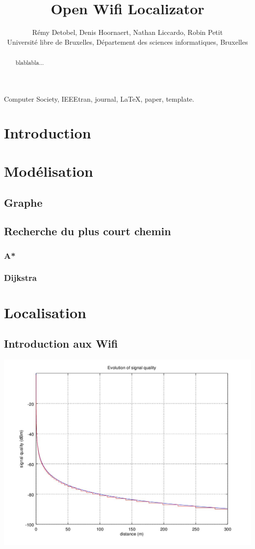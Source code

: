 \documentclass[11pt,journal,compsoc]{IEEEtran}
\begin{document}
\title{Open Wifi Localizator}
\author{Rémy Detobel, Denis Hoornaert, Nathan Liccardo, Robin Petit\\ Université libre de Bruxelles, Département des sciences informatiques, Bruxelles}

\maketitle


\begin{abstract}
  blablabla...
\end{abstract}
\begin{IEEEkeywords}
  Computer Society, IEEEtran, journal, \LaTeX, paper, template.
\end{IEEEkeywords}
\section{Introduction}
\section{Modélisation}
  \subsection{Graphe}
  \subsection{Recherche du plus court chemin}
    \subsubsection{A*}
    \subsubsection{Dijkstra}
\section{Localisation}
  \subsection{Introduction aux Wifi}
    \includegraphics[scale=0.4]{images/signal-propagation.jpg}
\end{document}
